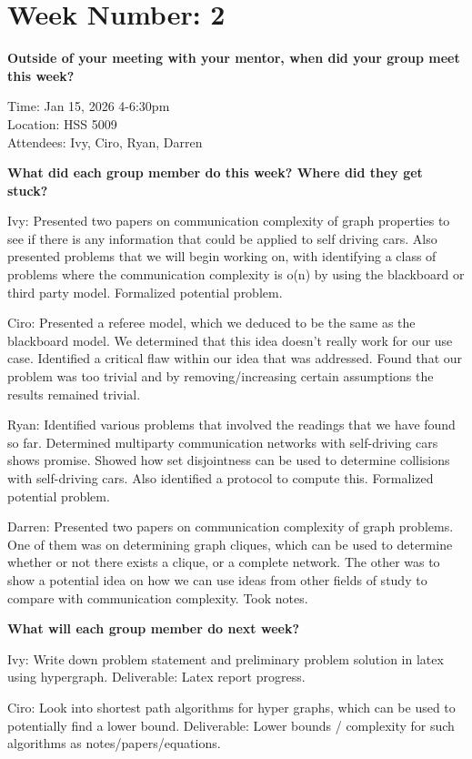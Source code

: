 \section{\texorpdfstring{\textbf{Week Number:
2}}{Week Number: 2}}\label{week-number-2}

\textbf{Outside of your meeting with your mentor, when did your group
meet this week?}

Time: Jan 15, 2026 4-6:30pm\\
Location: HSS 5009\\
Attendees: Ivy, Ciro, Ryan, Darren

\textbf{What did each group member do this week? Where did they get
stuck?}

Ivy: Presented two papers on communication complexity of graph
properties to see if there is any information that could be applied to
self driving cars. Also presented problems that we will begin working
on, with identifying a class of problems where the communication
complexity is o(n) by using the blackboard or third party model.
Formalized potential problem.

Ciro: Presented a referee model, which we deduced to be the same as the
blackboard model. We determined that this idea doesn't really work for
our use case. Identified a critical flaw within our idea that was
addressed. Found that our problem was too trivial and by
removing/increasing certain assumptions the results remained trivial.

Ryan: Identified various problems that involved the readings that we
have found so far. Determined multiparty communication networks with
self-driving cars shows promise. Showed how set disjointness can be used
to determine collisions with self-driving cars. Also identified a
protocol to compute this. Formalized potential problem.

Darren: Presented two papers on communication complexity of graph
problems. One of them was on determining graph cliques, which can be
used to determine whether or not there exists a clique, or a complete
network. The other was to show a potential idea on how we can use ideas
from other fields of study to compare with communication complexity.
Took notes.

\textbf{What will each group member do next week?}

Ivy: Write down problem statement and preliminary problem solution in
latex using hypergraph. Deliverable: Latex report progress.

Ciro: Look into shortest path algorithms for hyper graphs, which can be
used to potentially find a lower bound. Deliverable: Lower bounds /
complexity for such algorithms as notes/papers/equations.

